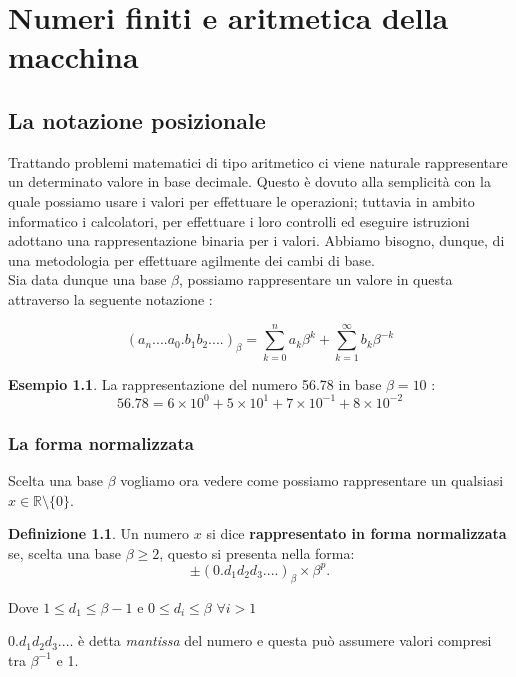 \documentclass[12pt, a4paper]{book}
\theoremstyle{definition}
\newtheorem{exmp}{Esempio}[section]
\newtheorem{defn}{Definizione}[section]
\begin{document}
\chapter{Numeri finiti e aritmetica della macchina}

\section{La notazione posizionale}
\begin{flushleft}
Trattando problemi matematici di tipo aritmetico ci viene naturale rappresentare un determinato valore in base decimale. Questo è dovuto alla semplicità con la quale possiamo usare i valori per effettuare le operazioni; tuttavia in ambito informatico i calcolatori, per effettuare i loro controlli ed eseguire istruzioni adottano una rappresentazione binaria per i valori. Abbiamo bisogno, dunque, di una metodologia per effettuare agilmente dei cambi di base.\\

Sia data dunque una base $\beta$, possiamo rappresentare un valore in questa attraverso la seguente notazione :

\[ 
	(a_{n}....a_{0}.b_{1}b_{2}....)_{\beta} = \sum_{k=0}^{n}a_{k}\beta^{k} + \sum_{k=1}^{\infty}b_{k}\beta^{-k} 
\]

\begin{exmp}
La rappresentazione del numero 56.78 in base $\beta = 10$ :
\[ 
	56.78 = 6 \times 10^{0} + 5 \times 10^{1} + 7 \times 10^{-1} + 8 \times 10^{-2}
\]
\end{exmp}
\end{flushleft}


\subsection{La forma normalizzata}
\begin{flushleft}
Scelta una base $\beta$ vogliamo ora vedere come possiamo rappresentare un qualsiasi $x \in \mathbb{R}  \setminus \{ 0 \}$.

\begin{defn}
Un numero $x$ si dice \textbf{rappresentato in forma normalizzata} se,  scelta una base $\beta \geq 2$,  questo si presenta nella forma: 
\[ 
	\pm (0.d_{1}d_{2}d_{3}....)_{\beta} \times \beta^{p}. 
\]

Dove $ 1 \leq d_{1} \leq \beta - 1 $ e $ 0 \leq d_{i} \leq \beta $ $\forall i > 1$
\end{defn}
$0.d_{1}d_{2}d_{3}....$ è detta \textit{mantissa} del numero e questa può assumere valori compresi tra $\beta^{-1}$ e 1.
\end{flushleft}
\end{document}
